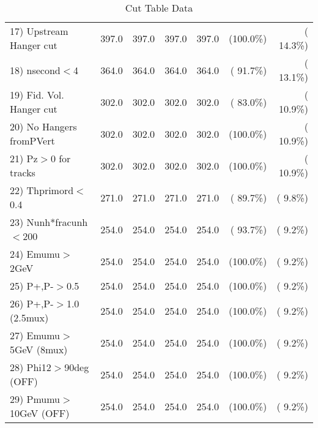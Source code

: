\begin{table}[h!]
\begin{tabular}{||l||r|r|r|r|r|r||}
 17) Upstream Hanger cut  &        397.0 &        397.0 &        397.0 &        397.0 & (100.0\%) & ( 14.3\%) \\
 18) nsecond$<$4          &        364.0 &        364.0 &        364.0 &        364.0 & ( 91.7\%) & ( 13.1\%) \\
 19) Fid. Vol. Hanger cut &        302.0 &        302.0 &        302.0 &        302.0 & ( 83.0\%) & ( 10.9\%) \\
 20) No Hangers fromPVert &        302.0 &        302.0 &        302.0 &        302.0 & (100.0\%) & ( 10.9\%) \\
 21) Pz$>$0 for tracks    &        302.0 &        302.0 &        302.0 &        302.0 & (100.0\%) & ( 10.9\%) \\
 22) Thprimord$<$0.4      &        271.0 &        271.0 &        271.0 &        271.0 & ( 89.7\%) & (  9.8\%) \\
 23) Nunh*fracunh$<$200   &        254.0 &        254.0 &        254.0 &        254.0 & ( 93.7\%) & (  9.2\%) \\
 24) Emumu$>$2GeV         &        254.0 &        254.0 &        254.0 &        254.0 & (100.0\%) & (  9.2\%) \\
 25) P+,P-$>$0.5          &        254.0 &        254.0 &        254.0 &        254.0 & (100.0\%) & (  9.2\%) \\
 26) P+,P-$>$1.0 (2.5mux) &        254.0 &        254.0 &        254.0 &        254.0 & (100.0\%) & (  9.2\%) \\
 27) Emumu$>$5GeV  (8mux) &        254.0 &        254.0 &        254.0 &        254.0 & (100.0\%) & (  9.2\%) \\
 28) Phi12$>$90deg  (OFF) &        254.0 &        254.0 &        254.0 &        254.0 & (100.0\%) & (  9.2\%) \\
 29) Pmumu$>$10GeV  (OFF) &        254.0 &        254.0 &        254.0 &        254.0 & (100.0\%) & (  9.2\%) \\
 \hline
 \hline
 \end{tabular}
 \caption{Cut Table  Data     }
 \label{tab-cutcohjpsi-mumu_data}
 \end{table}
